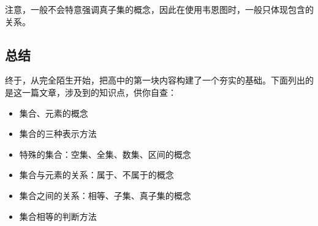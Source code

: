 注意，一般不会特意强调真子集的概念，因此在使用韦恩图时，一般只体现包含的关系。

\subsection{总结}

终于，从完全陌生开始，把高中的第一块内容构建了一个夯实的基础。下面列出的是这一篇文章，涉及到的知识点，供你自查：

\begin{itemize}
\item 集合、元素的概念
\item 集合的三种表示方法
\item 特殊的集合：空集、全集、数集、区间的概念
\item 集合与元素的关系：属于、不属于的概念
\item 集合之间的关系：相等、子集、真子集的概念
\item 集合相等的判断方法
\end{itemize}
